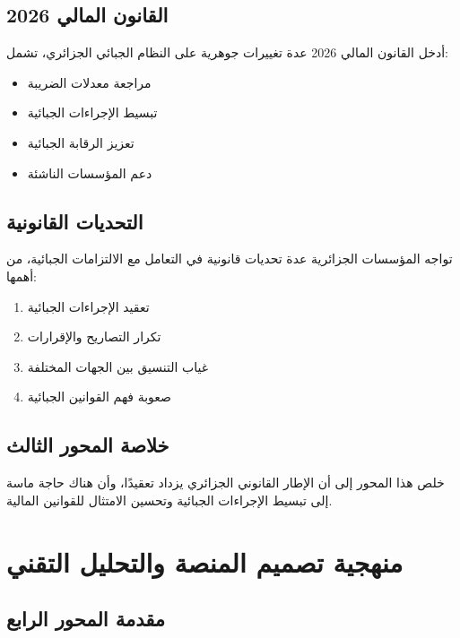 \documentclass[12pt, a4paper, twoside]{report}
\begin{document}
\section{القانون المالي 2026}

أدخل القانون المالي 2026 عدة تغييرات جوهرية على النظام الجبائي الجزائري، تشمل:
\begin{itemize}
    \item مراجعة معدلات الضريبة
    \item تبسيط الإجراءات الجبائية
    \item تعزيز الرقابة الجبائية
    \item دعم المؤسسات الناشئة
\end{itemize}

\section{التحديات القانونية}

تواجه المؤسسات الجزائرية عدة تحديات قانونية في التعامل مع الالتزامات الجبائية، من أهمها:
\begin{enumerate}
    \item تعقيد الإجراءات الجبائية
    \item تكرار التصاريح والإقرارات
    \item غياب التنسيق بين الجهات المختلفة
    \item صعوبة فهم القوانين الجبائية
\end{enumerate}

\section{خلاصة المحور الثالث}

خلص هذا المحور إلى أن الإطار القانوني الجزائري يزداد تعقيدًا، وأن هناك حاجة ماسة إلى تبسيط الإجراءات الجبائية وتحسين الامتثال للقوانين المالية.

\newpage

\chapter{منهجية تصميم المنصة والتحليل التقني}

\section{مقدمة المحور الرابع}
\end{document}
